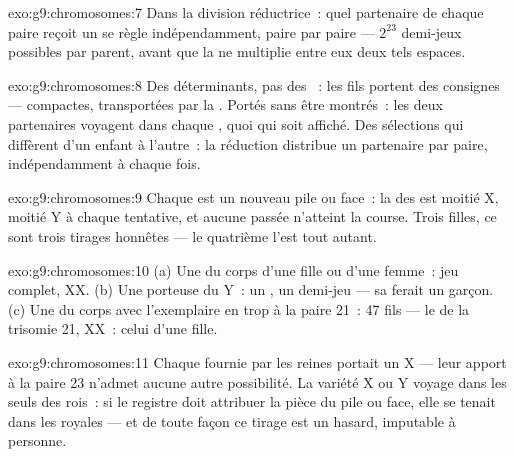 \begin{solution}{exo:g9:chromosomes:7}
Dans la division réductrice~: quel partenaire de chaque
paire reçoit un  se règle indépendamment, paire par
paire --- $2^{23}$ demi-jeux possibles par parent, avant
que la  ne multiplie entre eux deux tels espaces.
\end{solution}

\begin{solution}{exo:g9:chromosomes:8}
Des déterminants, pas des ~: les fils portent des
consignes --- compactes, transportées par la .
Portés sans être montrés~: les deux partenaires voyagent
dans chaque , quoi qui soit affiché. Des sélections
qui diffèrent d'un enfant à l'autre~: la réduction
distribue un partenaire par paire, indépendamment à chaque
fois.
\end{solution}

\begin{solution}{exo:g9:chromosomes:9}
Chaque  est un nouveau pile ou face~: la
 des  est moitié X, moitié Y à
chaque tentative, et aucune  passée n'atteint la
course. Trois filles, ce sont trois tirages honnêtes ---
le quatrième l'est tout autant.
\end{solution}

\begin{solution}{exo:g9:chromosomes:10}
(a) Une  du corps d'une fille ou d'une femme~: jeu
complet, XX. (b) Une  porteuse du Y~: un
, un demi-jeu --- sa  ferait un garçon.
(c) Une  du corps avec l'exemplaire en trop à la
paire 21~: 47 fils --- le  de la trisomie 21, XX~:
celui d'une fille.
\end{solution}

\begin{solution}{exo:g9:chromosomes:11}
Chaque  fournie par les reines portait un X ---
leur apport à la paire 23 n'admet aucune autre possibilité.
La variété X ou Y voyage dans les seuls  des rois~:
si le registre doit attribuer la pièce du pile ou face,
elle se tenait dans les  royales --- et de
toute façon ce tirage est un hasard, imputable à personne.
\end{solution}

